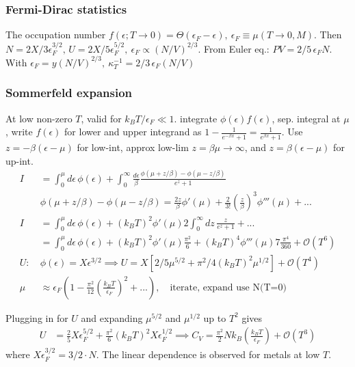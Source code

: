 \documentclass[a4paper, english, 12pt]{article}
\newcommand{\eps}{\epsilon}
\newcommand{\closed}[1]{\left( #1 \right)}
\begin{document}
\begin{multicols*}{2}
\subsubsection*{\scriptsize Fermi-Dirac statistics}
The occupation number $f(\eps;T\to0)=\Theta(\eps_F-\eps),\: \eps_F\equiv \mu(T\to0,M)$. Then $N=2X/3 \eps_F^{3/2},\,U=2X/5 \eps_F^{5/2},\: \eps_F\propto(N/V)^{2/3}$. From Euler eq.: $PV=2/5\,\eps_F N$. With $\eps_F=y(N/V)^{2/3},\:\kappa_T^{-1}=2/3\,\eps_F (N/V)$


\subsubsection*{\scriptsize Sommerfeld expansion}
At low non-zero $T$, valid for $k_B T/\eps_F\ll1$. integrate $\phi(\eps) f(\eps)$, sep. integral at $\mu$, write $f(\eps)$ for lower and upper integrand as $1 - \frac{1}{e^{-\beta x}+1}=\frac{1}{e^{\beta x}+1}$. Use $z=-\beta(\eps-\mu)$ for low-int, approx low-lim $z=\beta\mu\to\infty$, and $z=\beta(\eps-\mu)$ for up-int. 
\begin{align*}
    I &=\int_0^\mu d\eps\, \phi(\eps) + \int_0^\infty \frac{d\eps}{\beta} \frac{\phi(\mu+z/\beta) - \phi(\mu-z/\beta)}{e^{z} +1} \\
    &\phi(\mu+z/\beta) - \phi(\mu-z/\beta) = \frac{2z}{\beta}\phi'(\mu) + \frac{2}{3!}\closed{\frac{z}{\beta}}^3 \phi'''(\mu)+... \\
    I&= \int_0^\mu d\eps\, \phi(\eps) + (k_B T)^2 \phi'(\mu) 2 \int_{0}^\infty dz\, \frac{z}{e^z+1} + ... \\ 
    &= \int_0^\mu d\eps\, \phi(\eps) + (k_B T)^2 \phi'(\mu) \frac{\pi^2}{6} + (k_B T)^4 \phi'''(\mu) 7 \frac{\pi^4}{360} + \mathcal{O}(T^6) \\
    U:\:&\phi(\eps)=X\eps^{3/2}\implies U=X[2/5 \mu^{5/2} + \pi^2/4 (k_B T)^2 \mu^{1/2}] + \mathcal{O}(T^4) \\
    \mu &\approx \eps_F \closed{1 - \frac{\pi^2}{12} \closed{\frac{k_B T}{\eps_F}}^2+...},\quad\text{iterate, expand use N(T=0)}
\end{align*}

Plugging in for $U$ and expanding $\mu^{5/2}$ and $\mu^{1/2}$ up to $T^2$ gives 
\begin{align*}
    U &= \frac{2}{5}X\eps_F^{5/2} + \frac{\pi^2}{6}(k_B T)^2 X\eps_F^{1/2} \implies C_V = \frac{\pi^2}{2} Nk_B \closed{\frac{k_B T}{\eps_F}} + \mathcal{O}(T^3)
\end{align*}
where $X\eps_F^{3/2}=3/2\cdot N $. The linear dependence is observed for metals at low $T$. 




\end{multicols*}
\end{document}
